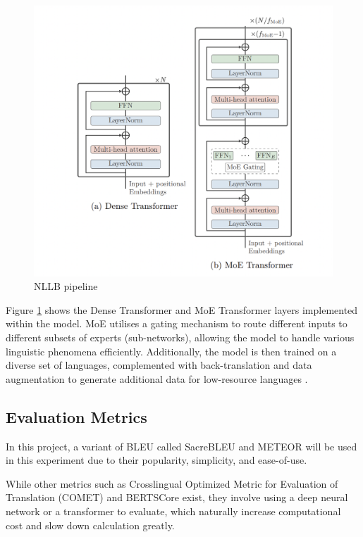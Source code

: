 \documentclass[a4paper]{article}
\begin{document}
\begin{figure}[htbp]
    \centering
    \includegraphics[width=0.7\linewidth]{images/nllb.png}
    \caption{NLLB pipeline \cite{nllb200-2020}}
    \label{fig:nllb}
\end{figure}

Figure \ref{fig:nllb} shows the Dense Transformer and MoE Transformer layers implemented within the model. MoE \cite{masoudnia-2012-moe} utilises a gating mechanism to route different inputs to different subsets of experts (sub-networks), allowing the model to handle various linguistic phenomena efficiently. Additionally, the model is then trained on a diverse set of languages, complemented with back-translation and data augmentation to generate additional data for low-resource languages \cite{nllb200-2020}.



\subsection{Evaluation Metrics}


In this project, a variant of BLEU \cite{papieni-2002-bleu} called SacreBLEU \cite{post-2018-sacrebleu} and METEOR \cite{lavie-2007-meteor} will be used in this experiment due to their popularity, simplicity, and ease-of-use.

While other metrics such as Crosslingual Optimized Metric for Evaluation of Translation (COMET) \cite{rei-2020-comet} and BERTSCore \cite{zhang-2020-bertscore} exist, they involve using a deep neural network or a transformer to evaluate, which naturally increase computational cost and slow down calculation greatly.
\end{document}
